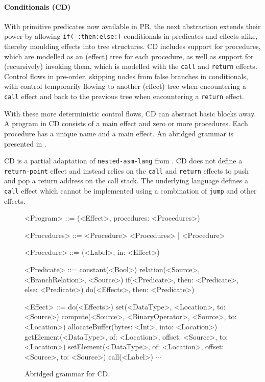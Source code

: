 \documentclass[main.tex]{subfiles}
\begin{document}
\paragraph{Conditionals (CD)} With primitive predicates now available in PR, the next abstraction extends their power by allowing \texttt{if(_:then:else:)} conditionals in predicates and effects alike, thereby moulding effects into tree structures. CD includes support for procedures, which are modelled as an (effect) tree for each procedure, as well as support for (recursively) invoking them, which is modelled with the \texttt{call} and \texttt{return} effects. Control flows in pre-order, skipping nodes from false branches in conditionals, with control temporarily flowing to another (effect) tree when encountering a \texttt{call} effect and back to the previous tree when encountering a \texttt{return} effect.

With these more deterministic control flows, CD can abstract basic blocks away. A program in CD consists of a main effect and zero or more procedures. Each procedure has a unique name and a main effect. An abridged grammar is presented in .

CD is a partial adaptation of \texttt{nested-asm-lang} from \cite{compcourse}. CD does not define a \texttt{return-point} effect and instead relies on the \texttt{call} and \texttt{return} effects to push and pop a return address on the call stack. The underlying language defines a \texttt{call} effect which cannot be implemented using a combination of \texttt{jump} and other effects.

\begin{figure}[ht]
	\small
	\begin{grammar}
		
		<Program> ::= (<Effect>, procedures: <Procedures>)
		
		<Procedures> ::= <Procedure> <Procedures> | <Procedure>
		
		<Procedure> ::= (<Label>, in: <Effect>)
		
		<Predicate> ::= constant(<Bool>)
			\alt relation(<Source>, <BranchRelation>, <Source>)
			\alt if(<Predicate>, then: <Predicate>, else: <Predicate>)
			\alt do(<Effects>, then: <Predicate>)
		
		<Effect> ::= do(<Effects>)
			\alt set(<DataType>, <Location>, to: <Source>)
			\alt compute(<Source>, <BinaryOperator>, <Source>, to: <Location>)
			\alt allocateBuffer(bytes: <Int>, into: <Location>)
			\alt getElement(<DataType>, of: <Location>, offset: <Source>, to: <Location>)
			\alt setElement(<DataType>, of: <Location>, offset: <Source>, to: <Source>)
			\alt call(<Label>)
			\alt $\cdots$
		
	\end{grammar}
	\caption{Abridged grammar for CD.}
	\label{bnf:cd}
\end{figure}
\end{document}
